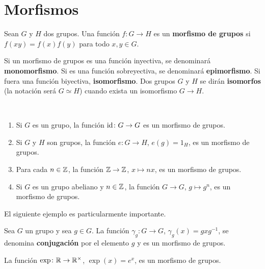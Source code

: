 \chapter{Morfismos}

\begin{definition}
	Sean $G$ y $H$ dos grupos. 
	Una función $f\colon G\to H$ es un \textbf{morfismo de grupos} si 
	$f(xy)=f(x)f(y)$ para todo $x,y\in G$. 
\end{definition}

Si un morfismo de grupos es una función inyectiva, se denominará
\textbf{monomorfismo}. Si es una función sobreyectiva, se denominará
\textbf{epimorfismo}.  Si fuera una función biyectiva, \textbf{isomorfismo}.
Dos grupos $G$ y $H$ se dirán \textbf{isomorfos} (la notación será $G\simeq H$)
cuando exista un isomorfismo $G\to H$. 

\begin{examples}\
\begin{enumerate}
\item Si $G$ es un grupo, la función $\operatorname{id}\colon G\to G$ es un morfismo de grupos.
\item Si $G$ y $H$ son grupos, la función $e\colon G\to H$, $e(g)=1_H$, es un morfismo de grupos. 
\item Para cada $n\in\mathbb{Z}$, la función $\mathbb{Z}\to\mathbb{Z}$, $x\mapsto nx$, es un morfismo de grupos.
\item Si $G$ es un grupo abeliano y $n\in\mathbb{Z}$, la función $G\to G$, $g\mapsto g^n$, es un morfismo de grupos.  	
\end{enumerate}
\end{examples}

El siguiente ejemplo es particularmente importante. 

\begin{example}
Sea $G$ un grupo y sea $g\in G$. La función $\gamma_g\colon G\to G$, $\gamma_g(x)=gxg^{-1}$, se denomina \textbf{conjugación} por el elemento $g$ y 
es un morfismo de grupos. 	
\end{example}

\begin{example}
La función $\exp\colon\mathbb{R}\to\mathbb{R}^\times$, $\exp(x)=e^x$, es un morfismo de grupos. 
\end{example}

